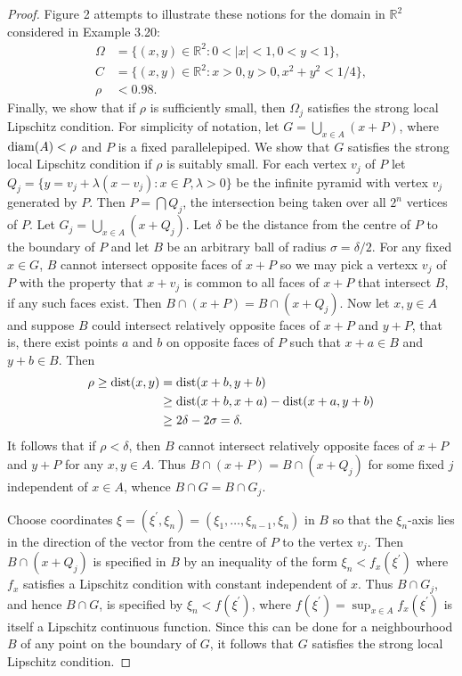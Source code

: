 \begin{proof}
  Figure 2 attempts to illustrate these notions for the domain in $\mathbb{R}^2$ considered in
  Example 3.20:
  \begin{align*}
    \Omega & = \{(x,y)\in \mathbb{R}^2 : 0 < |x| < 1, 0 < y < 1\}, \\
    C      & = \{(x,y)\in \mathbb{R}^2 : x > 0, y > 0, x^2 + y^2 < 1/4\}, \\
    \rho   & < 0.98.
  \end{align*}
  Finally, we show that if $\rho$ is sufficiently small, then $\Omega_j$
  satisfies the strong local Lipschitz condition. For simplicity of notation,
  let $G = \bigcup_{x\in A} (x+P)$, where $\operatorname{diam}(A)<\rho$ and $P$ is a fixed
  parallelepiped. We show that $G$ satisfies the strong local Lipschitz
  condition if $\rho$ is suitably small. For each vertex $v_j$ of $P$
  let $Q_j = \{y = v_j + \lambda(x-v_j) : x\in P, \lambda>0\}$ be the infinite pyramid
  with vertex $v_j$ generated by $P$. Then $P = \bigcap Q_j$, the intersection
  being taken over all $2^n$ vertices of $P$.
  Let $G_j = \bigcup_{x\in A}(x+Q_j)$. Let $\delta$ be the distance from the centre
  of $P$ to the boundary of $P$ and let $B$ be an arbitrary ball of radius $\sigma = \delta/2$.
  For any fixed $x\in G$, $B$ cannot intersect opposite faces of $x+P$ so we
  may pick a vertexx $v_j$ of $P$ with the property that $x+v_j$ is common
  to all faces of $x+P$ that intersect $B$, if any such faces exist.
  Then $B\cap (x+P) = B\cap (x+Q_j)$. Now let $x,y\in A$ and suppose $B$
  could intersect relatively opposite faces of $x+P$ and $y+P$,
  that is, there exist points $a$ and $b$ on opposite faces of $P$ such that
  $x+a\in B$ and $y+b\in B$. Then
  \begin{align*}
    \rho \geq \operatorname{dist}(x,y)
    & = \operatorname{dist}(x+b, y+b) \\
    & \geq \operatorname{dist}(x+b, x+a) - \operatorname{dist}(x+a, y+b) \\
    & \geq 2\delta - 2\sigma = \delta.
  \end{align*}
  It follows that if $\rho<\delta$, then $B$ cannot intersect relatively opposite faces of $x+P$ and $y+P$ for any $x, y \in A$. Thus $B \cap(x+P)=B \cap\left(x+Q_j\right)$ for some fixed $j$ independent of $x \in A$, whence $B \cap G=B \cap G_j$.
  
  Choose coordinates $\xi=\left(\xi^{\prime}, \xi_n\right)=\left(\xi_1, \ldots, \xi_{n-1}, \xi_n\right)$ in $B$ so that the $\xi_n$-axis lies in the direction of the vector from the centre of $P$ to the vertex $v_j$. Then $B \cap\left(x+Q_j\right)$ is specified in $B$ by an inequality of the form $\xi_n<f_x\left(\xi^{\prime}\right)$ where $f_x$ satisfies a Lipschitz condition with constant independent of $x$. Thus $B \cap G_j$, and hence $B \cap G$, is specified by $\xi_n<f\left(\xi^{\prime}\right)$, where $f\left(\xi^{\prime}\right)=\sup _{x \in A} f_x\left(\xi^{\prime}\right)$ is itself a Lipschitz continuous function. Since this can be done for a neighbourhood $B$ of any point on the boundary of $G$, it follows that $G$ satisfies the strong local Lipschitz condition.
\end{proof}


